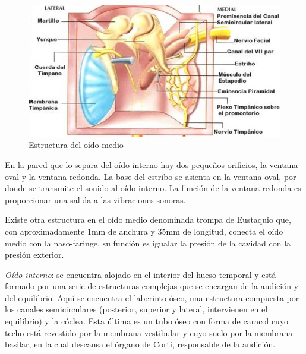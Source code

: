 \documentclass[11pt,a4paper]{article}
\begin{document}
	\begin{figure}[h]
		\centering
		\includegraphics[scale=.6]{OMedio.jpg}
		\caption{Estructura del oído medio}
	\end{figure}
	
	En la pared que lo separa del oído interno hay dos pequeños orificios, la ventana oval y la ventana redonda. La base del estribo se asienta en la ventana oval, por donde se transmite el sonido al oído interno. La función de la ventana redonda es proporcionar una salida a las vibraciones sonoras.
	
	Existe otra estructura en el oído medio denominada trompa de Eustaquio que, con aproximadamente $1$mm de anchura y $35$mm de longitud, conecta el oído medio con la naso-faringe, su función es igualar la presión de la cavidad con la presión exterior.
	
	\emph{Oído interno}: se encuentra alojado en el interior del hueso temporal y está formado por una serie de estructuras complejas que se encargan de la audición y del equilibrio. Aquí se encuentra el laberinto óseo, una estructura compuesta por los canales semicirculares (posterior, superior y lateral, intervienen en el equilibrio) y la cóclea. Esta última es un tubo óseo con forma de caracol cuyo techo está revestido por la membrana vestibular y cuyo suelo por la membrana basilar, en la cual descansa el órgano de Corti, responsable de la audición.
	
\end{document}
